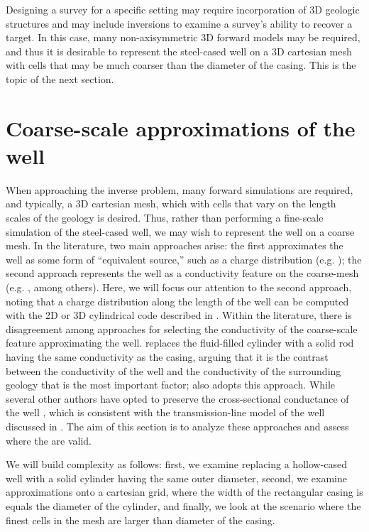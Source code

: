 Designing a survey for a specific setting may require incorporation of 3D geologic structures and may include inversions to examine a survey’s ability to recover a target. In this case, many non-axisymmetric 3D forward models may be required, and thus it is desirable to represent the steel-cased well on a 3D cartesian mesh with cells that may be much coarser than the diameter of the casing. This is the topic of the next section.
\section{Coarse-scale approximations of the well}
\label{sec:approximating_wells}

When approaching the inverse problem, many forward simulations are required, and typically, a 3D cartesian mesh, which with cells that vary on the length scales of the geology is desired. Thus, rather than performing a fine-scale simulation of the steel-cased well, we may wish to represent the well on a coarse mesh. In the literature, two main approaches arise: the first approximates the well as some form of ``equivalent source,'' such as a charge distribution (e.g. \cite{Weiss2016}); the second approach represents the well as a conductivity feature on the coarse-mesh (e.g. \cite{Swidinsky2013, Um2015, Kohnke2017, Puzyrev2017}, among others). Here, we will focus our attention to the second approach, noting that a charge distribution along the length of the well can be computed with the 2D or 3D cylindrical code described in \cite{Heagy2018}. Within the literature, there is disagreement among approaches for selecting the conductivity of the coarse-scale feature approximating the well. \cite{Um2015} replaces the fluid-filled cylinder with a solid rod having the same conductivity as the casing, arguing that it is the contrast between the conductivity of the well and the conductivity of the surrounding geology that is the most important factor; \cite{Puzyrev2017} also adopts this approach. While several other authors have opted to preserve the cross-sectional conductance of the well \citep{Swidinsky2013, Kohnke2017}, which is consistent with the transmission-line model of the well discussed in \cite{Kaufman1990}. The aim of this section is to analyze these approaches and assess where the are valid.

We will build complexity as follows: first, we examine replacing a hollow-cased well with a solid cylinder having the same outer diameter, second, we examine approximations onto a cartesian grid, where the width of the rectangular casing is equals the diameter of the cylinder, and finally, we look at the scenario where the finest cells in the mesh are larger than diameter of the casing.

